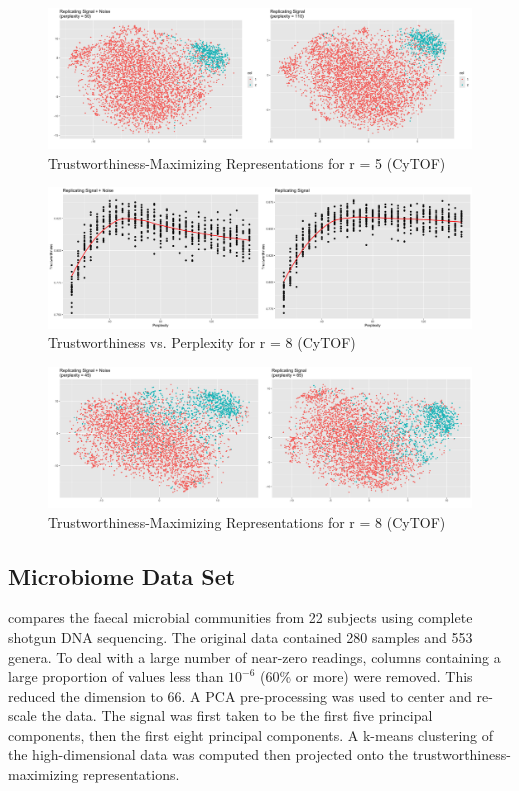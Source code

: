 \documentclass{article}
\begin{document}
\begin{figure}[H]
\centering
\includegraphics[scale=0.102]{best_rep_CyTOF}
\caption{Trustworthiness-Maximizing Representations for r = 5 (CyTOF)}
\end{figure}

\begin{figure}[H]
\centering
\includegraphics[scale=0.205]{trust_plot_CyTOF2}
\caption{Trustworthiness vs. Perplexity for r = 8 (CyTOF)}
\end{figure}

\begin{figure}[H]
\centering
\includegraphics[scale=0.102]{best_rep_CyTOF2}
\caption{Trustworthiness-Maximizing Representations for r = 8 (CyTOF)}
\end{figure}

\subsection{Microbiome Data Set}
\cite{enterotype data} compares the faecal microbial communities from 22 subjects using complete shotgun DNA sequencing. The original data contained 280 samples and 553 genera. To deal with a large number of near-zero readings, columns containing a large proportion of values less than $10^{-6}$ (60\% or more) were removed. This reduced the dimension to 66. A PCA pre-processing was used to center and re-scale the data. The signal was first taken to be the first five principal components, then the first eight principal components. A k-means clustering of the high-dimensional data was computed then projected onto the trustworthiness-maximizing representations.
\end{document}
